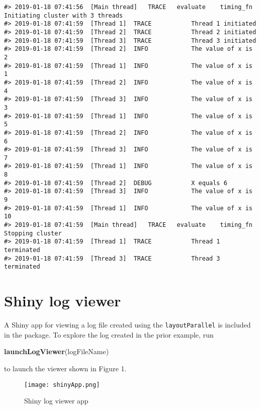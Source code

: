 \documentclass[]{article}
\newenvironment{Shaded}{\begin{snugshade}}{\end{snugshade}}
\newcommand{\KeywordTok}[1]{\textcolor[rgb]{0.13,0.29,0.53}{\textbf{#1}}}
\newcommand{\NormalTok}[1]{#1}
\begin{document}
\begin{verbatim}
#> 2019-01-18 07:41:56  [Main thread]   TRACE   evaluate    timing_fn   Initiating cluster with 3 threads
#> 2019-01-18 07:41:59  [Thread 1]  TRACE           Thread 1 initiated
#> 2019-01-18 07:41:59  [Thread 2]  TRACE           Thread 2 initiated
#> 2019-01-18 07:41:59  [Thread 3]  TRACE           Thread 3 initiated
#> 2019-01-18 07:41:59  [Thread 2]  INFO            The value of x is 2
#> 2019-01-18 07:41:59  [Thread 1]  INFO            The value of x is 1
#> 2019-01-18 07:41:59  [Thread 2]  INFO            The value of x is 4
#> 2019-01-18 07:41:59  [Thread 3]  INFO            The value of x is 3
#> 2019-01-18 07:41:59  [Thread 1]  INFO            The value of x is 5
#> 2019-01-18 07:41:59  [Thread 2]  INFO            The value of x is 6
#> 2019-01-18 07:41:59  [Thread 3]  INFO            The value of x is 7
#> 2019-01-18 07:41:59  [Thread 1]  INFO            The value of x is 8
#> 2019-01-18 07:41:59  [Thread 2]  DEBUG           X equals 6
#> 2019-01-18 07:41:59  [Thread 3]  INFO            The value of x is 9
#> 2019-01-18 07:41:59  [Thread 1]  INFO            The value of x is 10
#> 2019-01-18 07:41:59  [Main thread]   TRACE   evaluate    timing_fn   Stopping cluster
#> 2019-01-18 07:41:59  [Thread 1]  TRACE           Thread 1 terminated
#> 2019-01-18 07:41:59  [Thread 3]  TRACE           Thread 3 terminated
\end{verbatim}

\hypertarget{shiny-log-viewer}{%
\section{Shiny log viewer}\label{shiny-log-viewer}}

A Shiny app for viewing a log file created using the
\texttt{layoutParallel} is included in the package. To explore the log
created in the prior example, run

\begin{Shaded}
\begin{Highlighting}[]
\KeywordTok{launchLogViewer}\NormalTok{(logFileName)}
\end{Highlighting}
\end{Shaded}

to launch the viewer shown in Figure 1.

\begin{figure}
\centering
\texttt{[image: shinyApp.png]}
\caption{Shiny log viewer app}
\end{figure}
\end{document}
